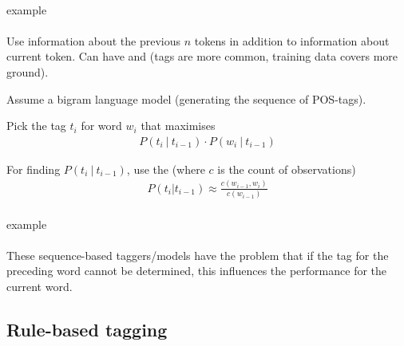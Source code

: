 \documentclass[10pt,twocolumn]{article}
\begin{document}
\paragraph{\textit{ \todo }} example

\paragraph{ } Use information about the previous $n$
tokens in addition to information about current token. Can have 
and  (tags are more common, training data covers more ground).

Assume a bigram language model (generating the sequence of POS-tags).

Pick the tag $t_i$ for word $w_i$ that maximises
\begin{align*}
  P(t_i ~|~ t_{i-1}) \cdot P(w_i~|~t_{i-1})
\end{align*}

For finding $P(t_i~|~t_{i-1})$, use the  (where
$c$ is the count of observations)
\begin{align*}
  P(t_i | t_{i-1}) \approx \frac{c(w_{i-1}, w_i)}{c(w_{i-1})}
\end{align*}


\paragraph{\textit{\todo}} example

\paragraph{} These sequence-based taggers/models have the problem that if the
tag for the preceding word cannot be determined, this influences the performance
for the current word.


\subsection{Rule-based tagging}
\end{document}
